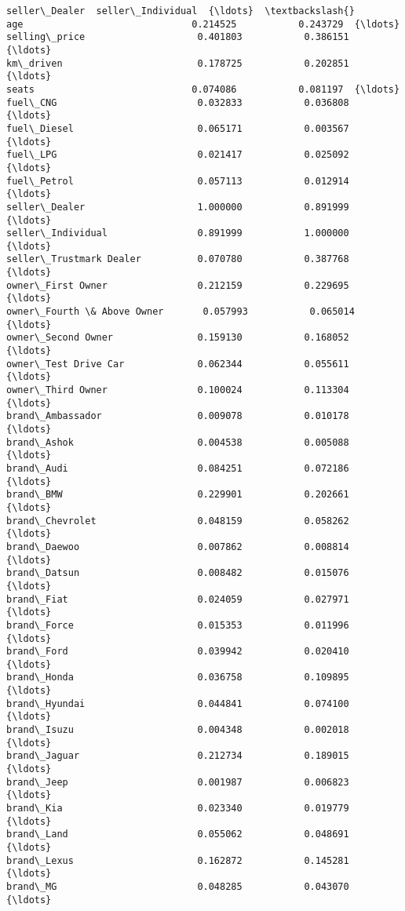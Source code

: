 \documentclass[11pt]{article}
\begin{document}
\begin{tcolorbox}[breakable, size=fbox, boxrule=.5pt, pad at break*=1mm, opacityfill=0]
\begin{Verbatim}[commandchars=\\\{\}]
                            seller\_Dealer  seller\_Individual  {\ldots}  \textbackslash{}
age                              0.214525           0.243729  {\ldots}
selling\_price                    0.401803           0.386151  {\ldots}
km\_driven                        0.178725           0.202851  {\ldots}
seats                            0.074086           0.081197  {\ldots}
fuel\_CNG                         0.032833           0.036808  {\ldots}
fuel\_Diesel                      0.065171           0.003567  {\ldots}
fuel\_LPG                         0.021417           0.025092  {\ldots}
fuel\_Petrol                      0.057113           0.012914  {\ldots}
seller\_Dealer                    1.000000           0.891999  {\ldots}
seller\_Individual                0.891999           1.000000  {\ldots}
seller\_Trustmark Dealer          0.070780           0.387768  {\ldots}
owner\_First Owner                0.212159           0.229695  {\ldots}
owner\_Fourth \& Above Owner       0.057993           0.065014  {\ldots}
owner\_Second Owner               0.159130           0.168052  {\ldots}
owner\_Test Drive Car             0.062344           0.055611  {\ldots}
owner\_Third Owner                0.100024           0.113304  {\ldots}
brand\_Ambassador                 0.009078           0.010178  {\ldots}
brand\_Ashok                      0.004538           0.005088  {\ldots}
brand\_Audi                       0.084251           0.072186  {\ldots}
brand\_BMW                        0.229901           0.202661  {\ldots}
brand\_Chevrolet                  0.048159           0.058262  {\ldots}
brand\_Daewoo                     0.007862           0.008814  {\ldots}
brand\_Datsun                     0.008482           0.015076  {\ldots}
brand\_Fiat                       0.024059           0.027971  {\ldots}
brand\_Force                      0.015353           0.011996  {\ldots}
brand\_Ford                       0.039942           0.020410  {\ldots}
brand\_Honda                      0.036758           0.109895  {\ldots}
brand\_Hyundai                    0.044841           0.074100  {\ldots}
brand\_Isuzu                      0.004348           0.002018  {\ldots}
brand\_Jaguar                     0.212734           0.189015  {\ldots}
brand\_Jeep                       0.001987           0.006823  {\ldots}
brand\_Kia                        0.023340           0.019779  {\ldots}
brand\_Land                       0.055062           0.048691  {\ldots}
brand\_Lexus                      0.162872           0.145281  {\ldots}
brand\_MG                         0.048285           0.043070  {\ldots}

\end{Verbatim}
\end{tcolorbox}
\end{document}
